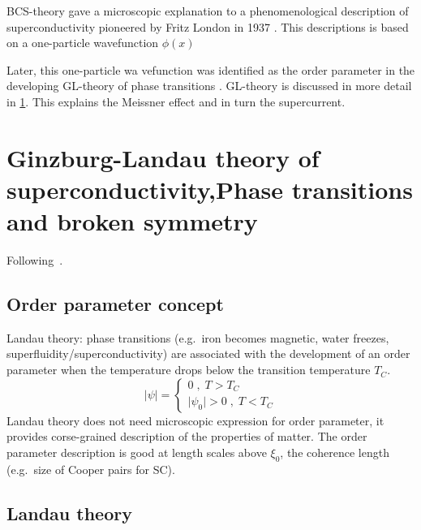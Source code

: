 \documentclass[../main.tex]{subfiles}
\begin{document}
BCS-theory gave a microscopic explanation to a phenomenological description of superconductivity pioneered by Fritz London in 1937 \cite{londonNewConceptionSupraconductivity1937}.
This descriptions is based on a one-particle wavefunction \(\phi (x)\)

Later, this one-particle wa
vefunction was identified as the order parameter in the developing GL-theory of phase transitions \cite{landauTheorySuperconductivity1965}.
GL-theory is discussed in more detail in \cref{sec:Ginzburg-Landau theory of superconductivity}.
This explains the Meissner effect and in turn the supercurrent.



\section{Ginzburg-Landau theory of superconductivity,Phase transitions and broken symmetry }\label{sec:Ginzburg-Landau theory of superconductivity}

Following~\cite[ch. 11]{colemanIntroductionManyBodyPhysics2015}.

\subsection{Order parameter concept}

Landau theory: phase transitions (e.g.\ iron becomes magnetic, water freezes, superfluidity/superconductivity) are associated with the development of an order parameter when the temperature drops below the transition temperature \(T_C\).
\begin{equation}
	\vert \psi \vert =
	\begin{cases}
		0\;,\; T > T_C \\
		\vert \psi_0 \vert > 0 \;,\; T < T_C
	\end{cases}
\end{equation}
Landau theory does not need microscopic expression for order parameter, it provides corse-grained description of the properties of matter.
The order parameter description is good at length scales above \(\xi_0\), the coherence length (e.g.\ size of Cooper pairs for SC).

\subsection{Landau theory}
\end{document}
